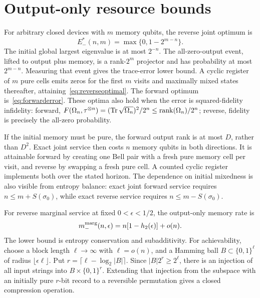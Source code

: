 \section{Output-only resource bounds}\label{app:resources}

For arbitrary closed devices with $m$ memory qubits, the reverse joint optimum is
\begin{equation}
 E_-^*(n,m)=\max\{0,1-2^{m-n}\}.
 \label{eq:reverseoptimal}
\end{equation}
The initial global largest eigenvalue is at most $2^{-n}$. The all-zero-output event, lifted to output plus memory, is a rank-$2^m$ projector and has probability at most $2^{m-n}$. Measuring that event gives the trace-error lower bound. A cyclic register of $m$ pure cells emits zeros for the first $m$ visits and maximally mixed states thereafter, attaining~\eqref{eq:reverseoptimal}. The forward optimum is~\eqref{eq:forwarderror}. These optima also hold when the error is squared-fidelity infidelity: forward, $F(\Omega_n,\tau^{\otimes n})=(\operatorname{Tr}\sqrt{\Omega_n})^2/2^n\le\operatorname{rank}(\Omega_n)/2^n$; reverse, fidelity is precisely the all-zero probability.

If the initial memory must be pure, the forward output rank is at most $D$, rather than $D^2$. Exact joint service then costs $n$ memory qubits in both directions. It is attainable forward by creating one Bell pair with a fresh pure memory cell per visit, and reverse by swapping a fresh pure cell. A counted cyclic register implements both over the stated horizon. The dependence on initial mixedness is also visible from entropy balance: exact joint forward service requires $n\le m+S(\sigma_0)$, while exact reverse service requires $n\le m-S(\sigma_0)$.

For reverse marginal service at fixed $0<\epsilon<1/2$, the output-only memory rate is
\begin{equation}
 m_-^{\rm marg}(n,\epsilon)=n[1-h_2(\epsilon)]+o(n).
 \label{eq:margcompression}
\end{equation}
The lower bound is entropy conservation and subadditivity. For achievability, choose a block length $\ell\to\infty$ with $\ell=o(n)$, and a Hamming ball $B\subset\{0,1\}^{\ell}$ of radius $\lfloor\epsilon\ell\rfloor$. Put $r=\lceil\ell-\log_2|B|\rceil$. Since $|B|2^r\ge2^\ell$, there is an injection of all input strings into $B\times\{0,1\}^r$. Extending that injection from the subspace with an initially pure $r$-bit record to a reversible permutation gives a closed compression operation.


